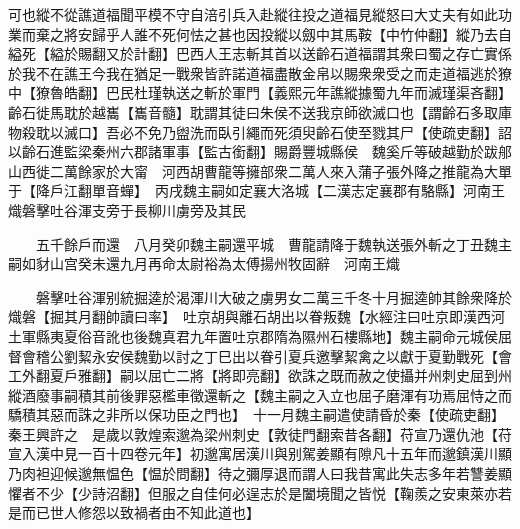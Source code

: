 可也縱不從譙道福聞平模不守自涪引兵入赴縱往投之道福見縱怒曰大丈夫有如此功業而棄之將安歸乎人誰不死何怯之甚也因投縱以劔中其馬鞍【中竹仲翻】縱乃去自縊死【縊於賜翻又於計翻】巴西人王志斬其首以送齡石道福謂其衆曰蜀之存亡實係於我不在譙王今我在猶足一戰衆皆許諾道福盡散金帛以賜衆衆受之而走道福逃於獠中【獠魯皓翻】巴民杜瑾執送之斬於軍門【義熙元年譙縱據蜀九年而滅瑾渠吝翻】齡石徙馬耽於越巂【巂音髓】耽謂其徒曰朱侯不送我京師欲滅口也【謂齡石多取庫物殺耽以滅口】吾必不免乃盥洗而臥引繩而死須臾齡石使至戮其尸【使疏吏翻】詔以齡石進監梁秦州六郡諸軍事【監古銜翻】賜爵豐城縣侯　魏奚斤等破越勤於跋郍山西徙二萬餘家於大甯　河西胡曹龍等擁部衆二萬人來入蒲子張外降之推龍為大單于【降戶江翻單音蟬】　丙戌魏主嗣如定襄大洛城【二漢志定襄郡有駱縣】河南王熾磐擊吐谷渾支旁于長柳川虜旁及其民

　　五千餘戶而還　八月癸卯魏主嗣還平城　曹龍請降于魏執送張外斬之丁丑魏主嗣如豺山宫癸未還九月再命太尉裕為太傅揚州牧固辭　河南王熾

　　磐擊吐谷渾别統掘逵於渴渾川大破之虜男女二萬三千冬十月掘逵帥其餘衆降於熾磐【掘其月翻帥讀曰率】　吐京胡與離石胡出以眷叛魏【水經注曰吐京即漢西河土軍縣夷夏俗音訛也後魏真君九年置吐京郡隋為隰州石樓縣地】魏主嗣命元城侯屈督會稽公劉絜永安侯魏勤以討之丁巳出以眷引夏兵邀擊絜禽之以獻于夏勤戰死【會工外翻夏戶雅翻】嗣以屈亡二將【將即亮翻】欲誅之既而赦之使攝并州刺史屈到州縱酒廢事嗣積其前後罪惡檻車徵還斬之【魏主嗣之入立也屈子磨渾有功焉屈恃之而驕積其惡而誅之非所以保功臣之門也】　十一月魏主嗣遣使請昏於秦【使疏吏翻】秦王興許之　是歲以敦煌索邈為梁州刺史【敦徒門翻索昔各翻】苻宣乃還仇池【苻宣入漢中見一百十四卷元年】初邈寓居漢川與别駕姜顯有隙凡十五年而邈鎮漢川顯乃肉袒迎候邈無愠色【愠於問翻】待之彌厚退而謂人曰我昔寓此失志多年若讐姜顯懼者不少【少詩沼翻】但服之自佳何必逞志於是闔境聞之皆悦【鞠羨之安東萊亦若是而已世人修怨以致禍者由不知此道也】

